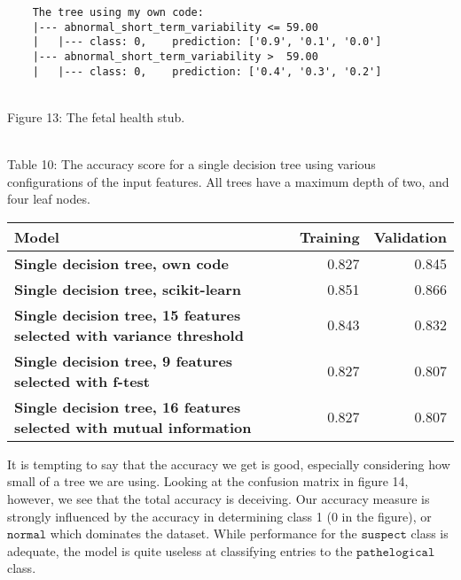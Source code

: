 \documentclass[11pt]{article}
\begin{document}
\begin{BVerbatim}
	The tree using my own code:
	|--- abnormal_short_term_variability <= 59.00
	|   |--- class: 0,    prediction: ['0.9', '0.1', '0.0']
	|--- abnormal_short_term_variability >  59.00
	|   |--- class: 0,    prediction: ['0.4', '0.3', '0.2']
\end{BVerbatim}
\\
Figure 13: The fetal health stub.
{ \hspace*{\fill} \\}

 
{ \hspace*{\fill} \\}
Table 10: The accuracy score for a single decision tree using various configurations of the input features. All trees have a maximum depth of two, and four leaf nodes.
\begin{table}[h!]
	\begin{center}
		\label{tab:table1}
		\begin{tabular}{l|r|r}
			\textbf{Model}                                                      		   & \textbf{Training} & \textbf{Validation}
			\\ \hline
			\textbf{Single decision tree, own code}                                        & 0.827         & 0.845               \\ \hline
			\textbf{Single decision tree, scikit-learn}                                    & 0.851         & 0.866               \\ \hline
			\textbf{Single decision tree, 15 features selected with variance threshold}    & 0.843         & 0.832               \\ \hline
			\textbf{Single decision tree, 9 features selected with f-test}                 & 0.827         & 0.807               \\ \hline
			\textbf{Single decision tree, 16 features selected with mutual information}    & 0.827         & 0.807               \\ \hline
		\end{tabular}
	\end{center}
\end{table}

It is tempting to say that the accuracy we get is good, especially considering how small of a tree we are using. Looking at the confusion matrix in figure 14, however, we see that the total accuracy is deceiving. Our accuracy measure is strongly influenced by the accuracy in determining class 1 (0 in the figure), or $\texttt{normal}$ which dominates the dataset. While performance for the $\texttt{suspect}$ class is adequate, the model is quite useless at classifying entries to the $\texttt{pathelogical}$ class. 
 
\end{document}
